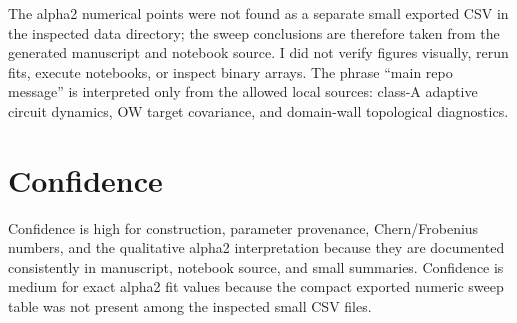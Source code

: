\documentclass[aps,prb,onecolumn,nofootinbib,superscriptaddress]{revtex4-2}
\begin{document}
The alpha2 numerical points were not found as a separate small exported CSV in the inspected data directory; the sweep conclusions are therefore taken from the generated manuscript and notebook source. I did not verify figures visually, rerun fits, execute notebooks, or inspect binary arrays. The phrase ``main repo message'' is interpreted only from the allowed local sources: class-A adaptive circuit dynamics, OW target covariance, and domain-wall topological diagnostics.

\section{Confidence}

Confidence is high for construction, parameter provenance, Chern/Frobenius numbers, and the qualitative alpha2 interpretation because they are documented consistently in manuscript, notebook source, and small summaries. Confidence is medium for exact alpha2 fit values because the compact exported numeric sweep table was not present among the inspected small CSV files.
\end{document}
